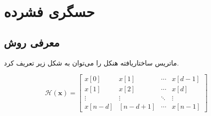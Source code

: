 \FloatBarrier
\section{حسگری فشرده}\label{ch:literature-review|sec:compressed-sensing}








\subsection{معرفی روش }\label{ch:literature-review|sec:compressed-sensing|subsec:aloha}


ماتریس ساختاریافته هنکل
را می‌توان به شکل زیر تعریف کرد.

\removevspace
\begin{equation}\label{eq:HankelStructuredMatrix}
	\mathcal{H}(\mathbf{x})=
	\left[\begin{array}{cccc}
		x[0] & x[1] & \cdots & x[d-1] \\
		x[1] & x[2] & \cdots & x[d] \\
		\vdots & \vdots & \ddots & \vdots \\
		x[n-d] & {[n-d+1]} & \cdots & x[n-1]
	\end{array}\right]
\end{equation}


